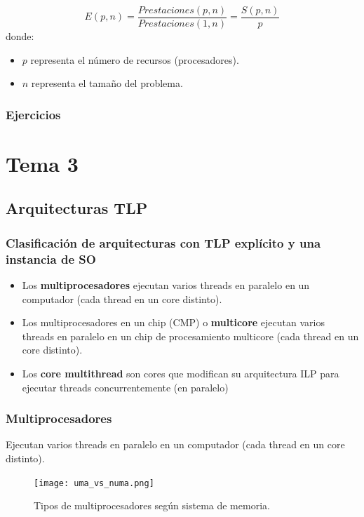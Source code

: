 \documentclass[12pt,spanish]{article}
\begin{document}
\begin{equation}
	E(p,n)=\frac{Prestaciones (p,n)}{Prestaciones (1,n)}=\frac{S(p,n)}{p}
\end{equation}
donde:
\begin{itemize}
	\item $p$ representa el número de recursos (procesadores).
	\item $n$ representa el tamaño del problema.
\end{itemize}


\subsubsection{Ejercicios}

\newpage

\section{Tema 3}

\subsection{Arquitecturas TLP}

\subsubsection{Clasificación de arquitecturas con TLP explícito y una instancia de SO}

\begin{itemize}
	\item Los \textbf{multiprocesadores} ejecutan varios threads en paralelo en un computador (cada thread en un core distinto). 
	\item Los multiprocesadores en un chip (CMP) o \textbf{multicore} ejecutan varios threads en paralelo en un chip de procesamiento multicore (cada thread en un core distinto).
	\item Los \textbf{core multithread} son cores que modifican su arquitectura ILP para ejecutar threads concurrentemente (en paralelo)
\end{itemize}

\subsubsection{Multiprocesadores}
Ejecutan varios threads en paralelo en un computador (cada thread en un core distinto). 
\begin{figure}[H]
\centering
\texttt{[image: uma\_vs\_numa.png]}
\caption{Tipos de multiprocesadores según sistema de memoria.}
\end{figure}
\end{document}
